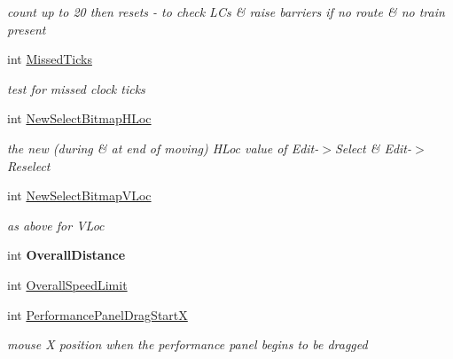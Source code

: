 \begin{DoxyCompactItemize}
\begin{DoxyCompactList}\small\item\em count up to 20 then resets -\/ to check L\+Cs \& raise barriers if no route \& no train present \end{DoxyCompactList}\item 
\mbox{\label{class_t_interface_a54f8918641a888d1a288c8a5573b2850}} 
int \mbox{\hyperlink{class_t_interface_a54f8918641a888d1a288c8a5573b2850}{Missed\+Ticks}}
\begin{DoxyCompactList}\small\item\em test for missed clock ticks \end{DoxyCompactList}\item 
\mbox{\label{class_t_interface_acc7d4b190b0401de81b7173e85cc7fe7}} 
int \mbox{\hyperlink{class_t_interface_acc7d4b190b0401de81b7173e85cc7fe7}{New\+Select\+Bitmap\+H\+Loc}}
\begin{DoxyCompactList}\small\item\em the new (during \& at end of moving) H\+Loc value of Edit-\/$>$Select \& Edit-\/$>$Reselect \end{DoxyCompactList}\item 
\mbox{\label{class_t_interface_abd8470c9d77aaaed996ab1451d28c9c6}} 
int \mbox{\hyperlink{class_t_interface_abd8470c9d77aaaed996ab1451d28c9c6}{New\+Select\+Bitmap\+V\+Loc}}
\begin{DoxyCompactList}\small\item\em as above for V\+Loc \end{DoxyCompactList}\item 
\mbox{\label{class_t_interface_a7ed3107d6e8a3851b082a7f655aa9a25}} 
int {\bfseries Overall\+Distance}
\item 
int \mbox{\hyperlink{class_t_interface_acc810716df0d41cad86bcba2027ff93e}{Overall\+Speed\+Limit}}
\item 
\mbox{\label{class_t_interface_a8822ab4cd1d23901ad2ada3a2ce3ead9}} 
int \mbox{\hyperlink{class_t_interface_a8822ab4cd1d23901ad2ada3a2ce3ead9}{Performance\+Panel\+Drag\+StartX}}
\begin{DoxyCompactList}\small\item\em mouse \textquotesingle{}X\textquotesingle{} position when the performance panel begins to be dragged \end{DoxyCompactList}\item 

\end{DoxyCompactItemize}
